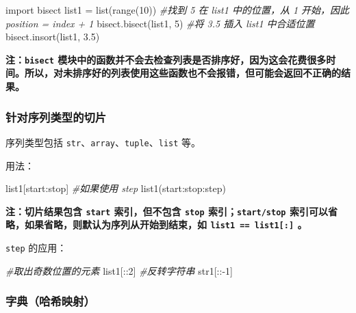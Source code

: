 \documentclass[]{ctexart}
\newenvironment{Shaded}{}{}
\newcommand{\DecValTok}[1]{\textcolor[rgb]{0.25,0.63,0.44}{{#1}}}
\newcommand{\FloatTok}[1]{\textcolor[rgb]{0.25,0.63,0.44}{{#1}}}
\newcommand{\ImportTok}[1]{{#1}}
\newcommand{\CommentTok}[1]{\textcolor[rgb]{0.38,0.63,0.69}{\textit{{#1}}}}
\newcommand{\OperatorTok}[1]{\textcolor[rgb]{0.40,0.40,0.40}{{#1}}}
\newcommand{\BuiltInTok}[1]{{#1}}
\newcommand{\NormalTok}[1]{{#1}}
\begin{document}
\begin{Shaded}
\begin{Highlighting}[]
\ImportTok{import} \NormalTok{bisect}
\NormalTok{list1 }\OperatorTok{=} \BuiltInTok{list}\NormalTok{(}\BuiltInTok{range}\NormalTok{(}\DecValTok{10}\NormalTok{))}
\CommentTok{#找到 5 在 list1 中的位置，从 1 开始，因此 position = index + 1}
\NormalTok{bisect.bisect(list1, }\DecValTok{5}\NormalTok{)}
\CommentTok{#将 3.5 插入 list1 中合适位置}
\NormalTok{bisect.insort(list1, }\FloatTok{3.5}\NormalTok{)}
\end{Highlighting}
\end{Shaded}

\textbf{注：\texttt{bisect}
模块中的函数并不会去检查列表是否排序好，因为这会花费很多时间。所以，对未排序好的列表使用这些函数也不会报错，但可能会返回不正确的结果。}

\subsubsection{针对序列类型的切片}\label{header-n158}

序列类型包括 \texttt{str}、\texttt{array}、\texttt{tuple}、\texttt{list}
等。

用法：

\begin{Shaded}
\begin{Highlighting}[]
\NormalTok{list1[start:stop]}
\CommentTok{#如果使用 step}
\NormalTok{list1(start:stop:step)}
\end{Highlighting}
\end{Shaded}

\textbf{注：切片结果包含 \texttt{start} 索引，但不包含 \texttt{stop}
索引；\texttt{start/stop}
索引可以省略，如果省略，则默认为序列从开始到结束，如
\texttt{list1\ ==\ list1{[}:{]}} 。}

\texttt{step} 的应用：

\begin{Shaded}
\begin{Highlighting}[]
\CommentTok{#取出奇数位置的元素}
\NormalTok{list1[::}\DecValTok{2}\NormalTok{]}
\CommentTok{#反转字符串}
\NormalTok{str1[::}\OperatorTok{-}\DecValTok{1}\NormalTok{]}
\end{Highlighting}
\end{Shaded}

\subsubsection{字典（哈希映射）}\label{header-n169}
\end{document}
